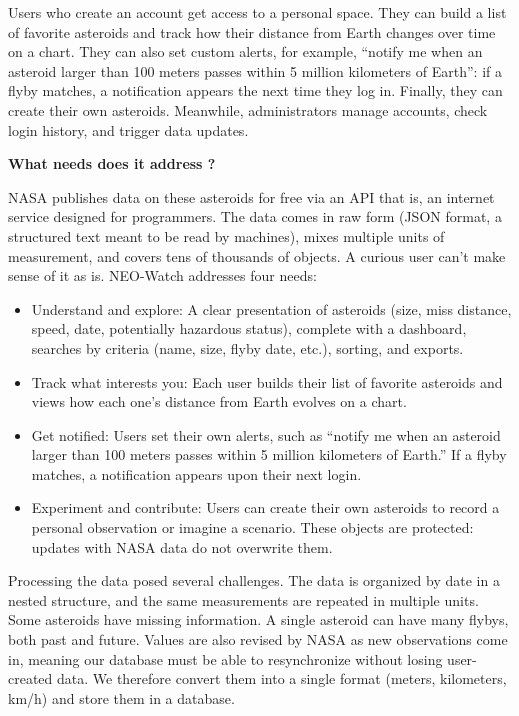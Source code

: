 \documentclass[
  french,
  11pt,
  a4paper,
]{report}
\providecommand{\tightlist}{%
  \setlength{\itemsep}{0pt}\setlength{\parskip}{0pt}}
\begin{document}
Users who create an account get access to a personal space. They can
build a list of favorite asteroids and track how their distance from
Earth changes over time on a chart. They can also set custom alerts, for
example, ``notify me when an asteroid larger than 100 meters passes
within 5 million kilometers of Earth'': if a flyby matches, a
notification appears the next time they log in. Finally, they can create
their own asteroids. Meanwhile, administrators manage accounts, check
login history, and trigger data updates.

\textbf{What needs does it address ?}

NASA publishes data on these asteroids for free via an API that is, an
internet service designed for programmers. The data comes in raw form
(JSON format, a structured text meant to be read by machines), mixes
multiple units of measurement, and covers tens of thousands of objects.
A curious user can't make sense of it as is. NEO-Watch addresses four
needs:

\begin{itemize}
\tightlist
\item
  Understand and explore: A clear presentation of asteroids (size, miss
  distance, speed, date, potentially hazardous status), complete with a
  dashboard, searches by criteria (name, size, flyby date, etc.),
  sorting, and exports.
\item
  Track what interests you: Each user builds their list of favorite
  asteroids and views how each one's distance from Earth evolves on a
  chart.
\item
  Get notified: Users set their own alerts, such as ``notify me when an
  asteroid larger than 100 meters passes within 5 million kilometers of
  Earth.'' If a flyby matches, a notification appears upon their next
  login.
\item
  Experiment and contribute: Users can create their own asteroids to
  record a personal observation or imagine a scenario. These objects are
  protected: updates with NASA data do not overwrite them.
\end{itemize}

Processing the data posed several challenges. The data is organized by
date in a nested structure, and the same measurements are repeated in
multiple units. Some asteroids have missing information. A single
asteroid can have many flybys, both past and future. Values are also
revised by NASA as new observations come in, meaning our database must
be able to resynchronize without losing user-created data. We therefore
convert them into a single format (meters, kilometers, km/h) and store
them in a database.
\end{document}
